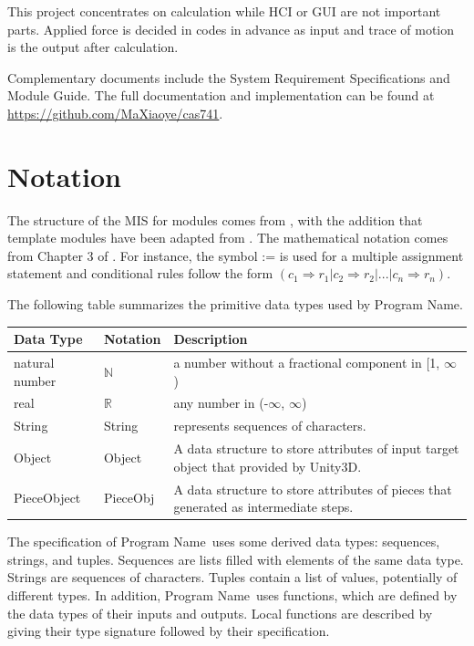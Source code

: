 \documentclass[12pt, titlepage]{article}
\newcommand{\progname}{Program Name}
\begin{document}
This project concentrates on calculation while
HCI or GUI are not important parts. Applied force is decided in codes in advance as input
and trace of motion is the output after calculation.

Complementary documents include the System Requirement Specifications
and Module Guide.  The full documentation and implementation can be
found at \url{https://github.com/MaXiaoye/cas741}.

\section{Notation}

The structure of the MIS for modules comes from \citet{HoffmanAndStrooper1995},
with the addition that template modules have been adapted from
\cite{GhezziEtAl2003}.  The mathematical notation comes from Chapter 3 of
\citet{HoffmanAndStrooper1995}.  For instance, the symbol := is used for a
multiple assignment statement and conditional rules follow the form $(c_1
\Rightarrow r_1 | c_2 \Rightarrow r_2 | ... | c_n \Rightarrow r_n )$.

The following table summarizes the primitive data types used by \progname. 

\begin{center}
\renewcommand{\arraystretch}{1.2}
\noindent 
\begin{tabular}{l l p{7.5cm}} 
\toprule 
\textbf{Data Type} & \textbf{Notation} & \textbf{Description}\\ 
\midrule
natural number & $\mathbb{N}$ & a number without a fractional component in [1, $\infty$) \\
real & $\mathbb{R}$ & any number in (-$\infty$, $\infty$)\\
String & String & represents sequences of characters.\\
Object & Object & A data structure to store attributes of input target object that provided by Unity3D.\\
PieceObject & PieceObj & A data structure to store attributes of pieces that generated as intermediate steps.\\
\bottomrule
\end{tabular} 
\end{center}

\noindent
The specification of \progname \ uses some derived data types: sequences, strings, and
tuples. Sequences are lists filled with elements of the same data type. Strings
are sequences of characters. Tuples contain a list of values, potentially of
different types. In addition, \progname \ uses functions, which
are defined by the data types of their inputs and outputs. Local functions are
described by giving their type signature followed by their specification.
\end{document}
